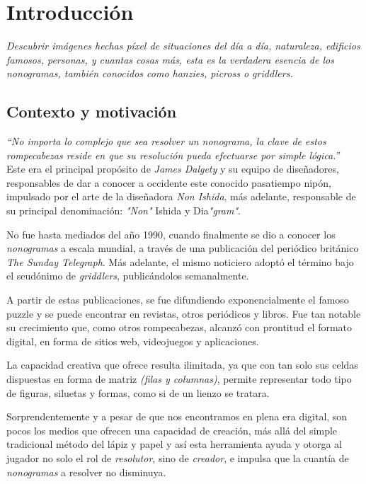 \chapter{Introducción}

\textit{Descubrir imágenes hechas píxel de situaciones del día a día,
naturaleza, edificios famosos, personas, y cuantas cosas más, esta es la verdadera esencia de
los nonogramas, también conocidos como hanzies, picross o griddlers.}

\section{Contexto y motivación}

\textit{``No importa lo complejo que sea resolver un nonograma, la clave de
estos rompecabezas reside en que su resolución pueda efectuarse por simple
lógica.''~\cite{dalgety_2017}} Este era el principal propósito de \textit{James Dalgety} y su equipo
de diseñadores, responsables de dar a conocer a occidente este conocido
pasatiempo nipón, impulsado por el arte de la diseñadora \textit{Non Ishida}, más
adelante, responsable de su principal denominación: \textit{"Non"} Ishida y
Dia\textit{"gram"}.

No fue hasta mediados del año 1990, cuando finalmente se dio a conocer los \textit{nonogramas} a escala
mundial, a través de una publicación del periódico británico \textit{The Sunday
Telegraph}. Más adelante, el mismo noticiero adoptó el término bajo el
seudónimo de \textit{griddlers}, publicándolos semanalmente.

A partir de estas publicaciones, se fue difundiendo exponencialmente el famoso puzzle y
se puede encontrar en revistas, otros periódicos y libros. Fue tan notable su
crecimiento que, como otros rompecabezas, alcanzó con prontitud el formato
digital, en forma de sitios web, videojuegos y aplicaciones.

La capacidad creativa que ofrece resulta ilimitada, ya que con tan solo sus
celdas dispuestas en forma de matriz \textit{(filas y columnas)}, permite
representar todo tipo de figuras, siluetas y formas, como si de un lienzo se
tratara. 

Sorprendentemente y a pesar de que nos encontramos en plena era digital, son pocos los
medios que ofrecen una capacidad de creación, más allá del simple
tradicional método del lápiz y papel y así esta herramienta ayuda y otorga al jugador no solo el rol de \textit{resolutor}, sino de \textit{creador},
e impulsa que la cuantía de \textit{nonogramas} a resolver no disminuya.

